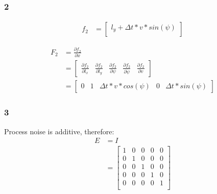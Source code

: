 \documentclass[12pt]{article}
\begin{document}
\subsubsection{2}
\begin{align*}
    f_2 & =
    \begin{bmatrix}
        l_y + \Delta{t} * v * sin(\psi) \\
    \end{bmatrix}
\end{align*}

\begin{align*}
    F_2 & = \frac{\partial{f_2}}{\partial{x}} \\
        & = \begin{bmatrix}
        \frac{\partial{f_2}}{\partial{l_x}} & \frac{\partial{f_2}}{\partial{l_y}} & \frac{\partial{f_2}}{\partial{\psi}} & \frac{\partial{f_2}}{\partial{\dot\psi}} & \frac{\partial{f_2}}{\partial{v}}
    \end{bmatrix}        \\
        & = \begin{bmatrix}
        0 & 1 & \Delta{t}*v*cos(\psi) & 0 & \Delta{t}*sin(\psi)
    \end{bmatrix}
\end{align*}
\subsubsection{3}
Process noise is additive, therefore:
\begin{align*}
    E & = I                          \\
      & = \begin{bmatrix}
        1 & 0 & 0 & 0 & 0 \\
        0 & 1 & 0 & 0 & 0 \\
        0 & 0 & 1 & 0 & 0 \\
        0 & 0 & 0 & 1 & 0 \\
        0 & 0 & 0 & 0 & 1 \\
    \end{bmatrix}
\end{align*}
\end{document}
